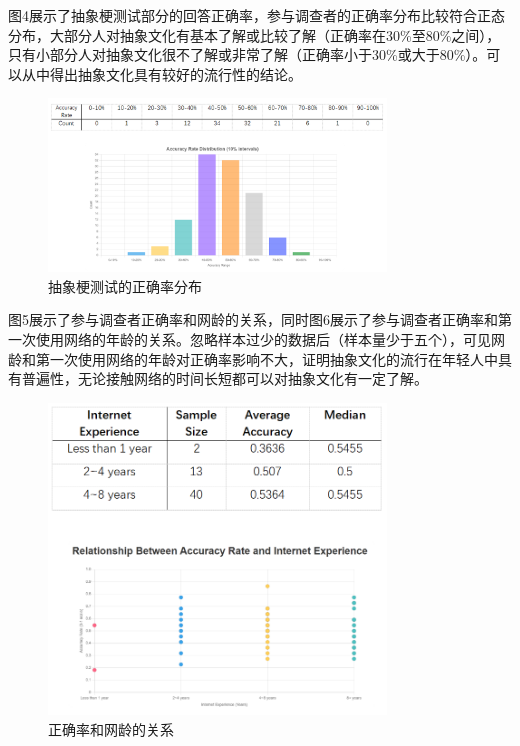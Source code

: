 \documentclass[12pt,a4paper]{ctexart}
\begin{document}
图4展示了抽象梗测试部分的回答正确率，参与调查者的正确率分布比较符合正态分布，大部分人对抽象文化有基本了解或比较了解（正确率在30\%至80\%之间），只有小部分人对抽象文化很不了解或非常了解（正确率小于30\%或大于80\%）。可以从中得出抽象文化具有较好的流行性的结论。

\begin{figure}[htbp]
    \centering
    \includegraphics[width=0.8\textwidth]{img/abstract_test_accuracy.png}
    \caption{抽象梗测试的正确率分布}
    \label{fig:abstract_test_accuracy}
\end{figure}

图5展示了参与调查者正确率和网龄的关系，同时图6展示了参与调查者正确率和第一次使用网络的年龄的关系。忽略样本过少的数据后（样本量少于五个），可见网龄和第一次使用网络的年龄对正确率影响不大，证明抽象文化的流行在年轻人中具有普遍性，无论接触网络的时间长短都可以对抽象文化有一定了解。

\begin{figure}[htbp]
    \centering
    \includegraphics[width=0.8\textwidth]{img/accuracy_vs_net_age.png}
    \caption{正确率和网龄的关系}
    \label{fig:accuracy_vs_net_age}
\end{figure}
\end{document}
